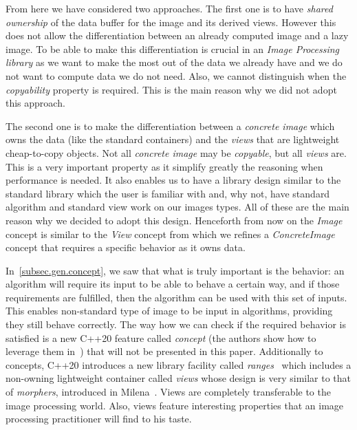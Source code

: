 From here we have considered two approaches. The first one is to have \emph{shared ownership} of the data buffer for the
image and its derived views. However this does not allow the differentiation between an already computed image and a
lazy image. To be able to make this differentiation is crucial in an \emph{Image Processing library} as we want to make
the most out of the data we already have and we do not want to compute data we do not need. Also, we cannot distinguish
when the \emph{copyability} property is required. This is the main reason why we did not adopt this approach.

The second one is to make the differentiation between a \emph{concrete image} which owns the data (like the standard
containers) and the \emph{views} that are lightweight cheap-to-copy objects. Not all \emph{concrete image} may be
\emph{copyable}, but all \emph{views} are. This is a very important property as it simplify greatly the reasoning when
performance is needed. It also enables us to have a library design similar to the standard library which the user is
familiar with and, why not, have standard algorithm and standard view work on our images types. All of these are the
main reason why we decided to adopt this design. Henceforth from now on the \emph{Image} concept is similar to the
\emph{View} concept from which we refines a \emph{ConcreteImage} concept that requires a specific behavior as it owns
data.


\vspace{1cm}

In~\cref{subsec.gen.concept}, we saw that what is truly important is the behavior: an algorithm will require its input
to be able to behave a certain way, and if those requirements are fulfilled, then the algorithm can be used with this
set of inputs. This enables non-standard type of image to be input in algorithms, providing they still behave correctly.
The way how we can check if the required behavior is satisfied is a new C++20 feature called \emph{concept} (the authors
show how to leverage them in~\cite{roynard.2019.rrpr}) that will not be presented in this paper. Additionally to
concepts, C++20 introduces a new library facility called \emph{ranges}~\cite{niebler.2018.deepranges} which includes a
non-owning lightweight container called \emph{views} whose design is very similar to that of \emph{morphers}, introduced
in Milena~\cite{levillain.2009.ismm,geraud.2012.hdr}. Views are completely transferable to the image processing world.
Also, views feature interesting properties that an image processing practitioner will find to his taste.

